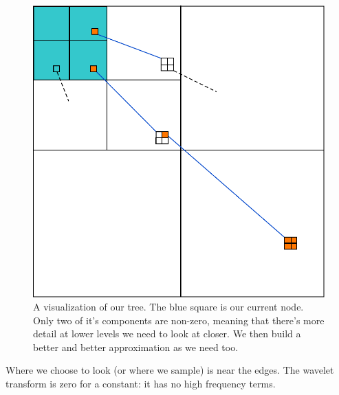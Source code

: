 \documentclass{article}
\begin{document}
            \begin{figure}[h]
                \includegraphics[angle=0]{better_diagram}
                \caption{A visualization of our tree. The blue square is our current node. Only two of it's components are non-zero, meaning that there's more detail at lower levels we need to look at closer. We then build a better and better approximation as we need too.}
                \label{fig:tree}
            \end{figure}
            
            Where we choose to look (or where we sample) is near the edges. The wavelet transform is zero for a constant: it has no high frequency terms.
\end{document}
